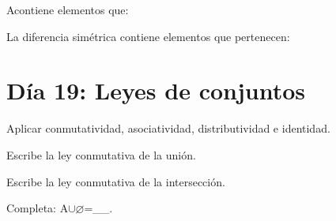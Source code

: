 \begin{activity}[id=dia-18-opcion-01,type=choice,weight=1]

A\B contiene elementos que:





\end{activity}

\begin{activity}[id=dia-18-opcion-02,type=choice,weight=1]

La diferencia simétrica contiene elementos que pertenecen:





\end{activity}

\section{Día 19: Leyes de conjuntos}

\begin{lesson}[id=dia-19-lectura,weight=0]

Aplicar conmutatividad, asociatividad, distributividad e identidad.

\end{lesson}

\begin{activity}[id=dia-19-corta-01,type=short,weight=1]

Escribe la ley conmutativa de la unión.

\end{activity}

\begin{activity}[id=dia-19-corta-02,type=short,weight=1]

Escribe la ley conmutativa de la intersección.

\end{activity}

\begin{activity}[id=dia-19-corta-03,type=short,weight=1]

Completa: A\(\cup\)\(\varnothing\)=__.

\end{activity}


